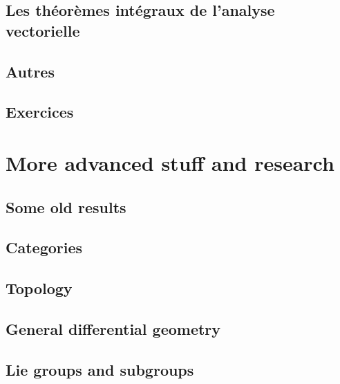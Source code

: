 \chapter{Les théorèmes intégraux de l'analyse vectorielle}


\chapter{Autres}


\chapter{Exercices}




\part{More advanced stuff and research}



\chapter{Some old results}


\chapter{Categories}        \label{chap_category}


\chapter{Topology}              \label{chap_topology}



\chapter{General differential geometry} \label{Chapitre_FB}


\chapter{Lie groups and subgroups}


